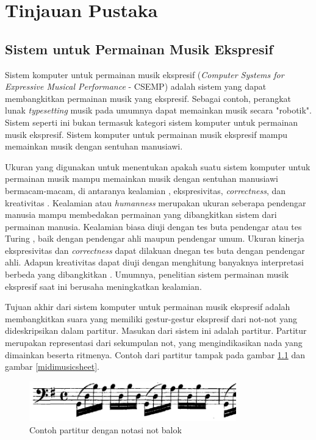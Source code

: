 \chapter{Tinjauan Pustaka}

\section{Sistem untuk Permainan Musik Ekspresif}

Sistem komputer untuk permainan musik ekspresif (\textit{Computer Systems for Expressive Musical Performance} - CSEMP) adalah sistem yang dapat membangkitkan permainan musik yang ekspresif. Sebagai contoh, perangkat lunak \textit{typesetting} musik pada umumnya dapat memainkan musik secara "robotik". Sistem seperti ini bukan termasuk kategori sistem komputer untuk permainan musik ekspresif. Sistem komputer untuk permainan musik ekspresif mampu memainkan musik dengan sentuhan manusiawi. \parencite{miranda2010}

Ukuran yang digunakan untuk menentukan apakah suatu sistem komputer untuk permainan musik mampu memainkan musik dengan sentuhan manusiawi bermacam-macam, di antaranya kealamian \parencite{schubert2017test}, ekspresivitas, \textit{correctness}, dan kreativitas \parencite{miranda2010}. Kealamian atau \textit{humanness} merupakan ukuran seberapa pendengar manusia mampu membedakan permainan yang dibangkitkan sistem dari permainan manusia. Kealamian biasa diuji dengan tes buta pendengar atau tes Turing \parencite{schubert2017test}, baik dengan pendengar ahli maupun pendengar umum. Ukuran kinerja ekspresivitas dan \textit{correctness} dapat dilakuan dnegan tes buta dengan pendengar ahli. Adapun kreativitas dapat diuji dengan menghitung banyaknya interpretasi berbeda yang dibangkitkan \parencite{miranda2010}. Umumnya, penelitian sistem permainan musik ekspresif saat ini berusaha meningkatkan kealamian.

Tujuan akhir dari sistem komputer untuk permainan musik ekspresif adalah membangkitkan suara yang memiliki gestur-gestur ekspresif dari not-not yang dideskripsikan dalam partitur. Masukan dari sistem ini adalah partitur. Partitur merupakan representasi dari sekumpulan not, yang mengindikasikan nada yang dimainkan beserta ritmenya. Contoh dari partitur tampak pada gambar \ref{humanmusicsheet} dan gambar \ref{midimusicsheet}.

\begin{figure}[h]
    \centering
    \includegraphics[width=0.8\textwidth]{resources/sheet-example-human.png}
    \caption{Contoh partitur dengan notasi not balok} \label{humanmusicsheet}
\end{figure}

